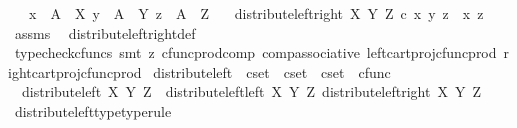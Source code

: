 \begin{isabellebody}
\ \ \ {\isachardoublequoteopen}x\ {\isacharcolon}{\kern0pt}\ A\ {\isasymrightarrow}\ X{\isachardoublequoteclose}\ {\isachardoublequoteopen}y\ {\isacharcolon}{\kern0pt}\ A\ {\isasymrightarrow}\ Y{\isachardoublequoteclose}\ {\isachardoublequoteopen}z\ {\isacharcolon}{\kern0pt}\ A\ {\isasymrightarrow}\ Z{\isachardoublequoteclose}\isanewline
\ \ \ {\isachardoublequoteopen}distribute{\isacharunderscore}{\kern0pt}left{\isacharunderscore}{\kern0pt}right\ X\ Y\ Z\ {\isasymcirc}\isactrlsub c\ {\isasymlangle}x{\isacharcomma}{\kern0pt}\ {\isasymlangle}y{\isacharcomma}{\kern0pt}\ z{\isasymrangle}{\isasymrangle}\ {\isacharequal}{\kern0pt}\ {\isasymlangle}x{\isacharcomma}{\kern0pt}\ z{\isasymrangle}{\isachardoublequoteclose}\isanewline
%
\isadelimproof
\ \ %
\endisadelimproof
%
\isatagproof
{}\isamarkupfalse%
\ assms\ \isamarkupfalse%
\ distribute{\isacharunderscore}{\kern0pt}left{\isacharunderscore}{\kern0pt}right{\isacharunderscore}{\kern0pt}def\ \ \isanewline
\ \ \isamarkupfalse%
\ {\isacharparenleft}{\kern0pt}typecheck{\isacharunderscore}{\kern0pt}cfuncs{\isacharcomma}{\kern0pt}\ smt\ {\isacharparenleft}{\kern0pt}z{}{\isacharparenright}{\kern0pt}\ cfunc{\isacharunderscore}{\kern0pt}prod{\isacharunderscore}{\kern0pt}comp\ comp{\isacharunderscore}{\kern0pt}associative{}\ left{\isacharunderscore}{\kern0pt}cart{\isacharunderscore}{\kern0pt}proj{\isacharunderscore}{\kern0pt}cfunc{\isacharunderscore}{\kern0pt}prod\ right{\isacharunderscore}{\kern0pt}cart{\isacharunderscore}{\kern0pt}proj{\isacharunderscore}{\kern0pt}cfunc{\isacharunderscore}{\kern0pt}prod{\isacharparenright}{\kern0pt}%
\endisatagproof
{\isafoldproof}%
%
\isadelimproof
\isanewline
%
\endisadelimproof
\isanewline
{}\isamarkupfalse%
\ distribute{\isacharunderscore}{\kern0pt}left\ {\isacharcolon}{\kern0pt}{\isacharcolon}{\kern0pt}\ {\isachardoublequoteopen}cset\ {\isasymRightarrow}\ cset\ {\isasymRightarrow}\ cset\ {\isasymRightarrow}\ cfunc{\isachardoublequoteclose}\ \isanewline
\ \ {\isachardoublequoteopen}distribute{\isacharunderscore}{\kern0pt}left\ X\ Y\ Z\ {\isacharequal}{\kern0pt}\ {\isasymlangle}distribute{\isacharunderscore}{\kern0pt}left{\isacharunderscore}{\kern0pt}left\ X\ Y\ Z{\isacharcomma}{\kern0pt}\ distribute{\isacharunderscore}{\kern0pt}left{\isacharunderscore}{\kern0pt}right\ X\ Y\ Z{\isasymrangle}{\isachardoublequoteclose}\isanewline
\isanewline
{}\isamarkupfalse%
\ distribute{\isacharunderscore}{\kern0pt}left{\isacharunderscore}{\kern0pt}type{\isacharbrackleft}{\kern0pt}type{\isacharunderscore}{\kern0pt}rule{\isacharbrackright}{\kern0pt}{\isacharcolon}{\kern0pt}\isanewline

\end{isabellebody}
